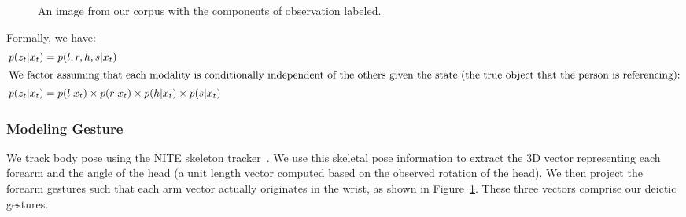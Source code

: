 \documentclass[a4paper, 11pt]{article} %
\begin{document}
\begin{figure}[h]
\centering
{}
\caption{An image from our corpus with the components of observation labeled.\label{fig:labeled_obs}}
\end{figure}
Formally, we have:
\begin{align}
p(z_t | x_t) &= p(l, r, h, s | x_t)\\
\intertext{We factor assuming that each modality is conditionally independent of the others given the state (the true object that the person is referencing):}
p(z_t | x_t) &= p(l | x_t) \times p(r | x_t) \times p(h | x_t) \times p(s | x_t)
\end{align}
\subsubsection{Modeling Gesture}
We track body pose using the NITE skeleton tracker~\citep{openni}. We use this skeletal pose information to extract the 3D vector representing each forearm and the angle of the head (a unit length vector computed based on the observed rotation of the head). We then project the forearm gestures such that each arm vector actually originates in the wrist, as shown in Figure~\ref{fig:labeled_obs}. These three vectors comprise our deictic gestures.
\end{document}
